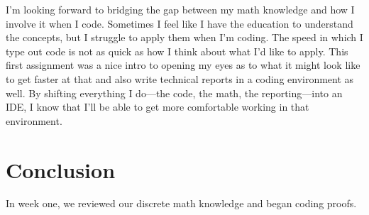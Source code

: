 \documentclass{article}
\begin{document}
I'm looking forward to bridging the gap between my math knowledge and how I involve it when I code. Sometimes I feel like I have the education to understand the concepts, but I struggle to apply them when I'm coding. The speed in which I type out code is not as quick as how I think about what I'd like to apply. This first assignment was a nice intro to opening my eyes as to what it might look like to get faster at that and also write technical reports in a coding environment as well. By shifting everything I do—the code, the math, the reporting—into an IDE, I know that I'll be able to get more comfortable working in that environment.

\section*{Conclusion}
In week one, we reviewed our discrete math knowledge and began coding proofs.
\end{document}
